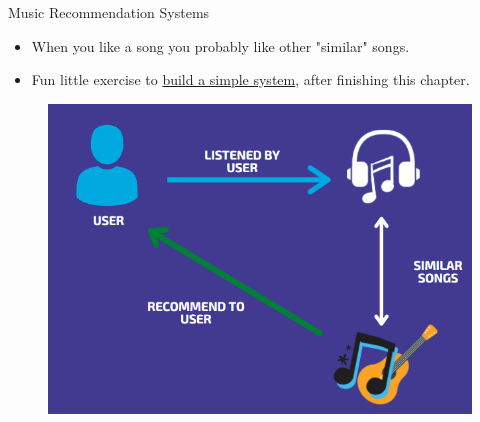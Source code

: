 \documentclass[serif, aspectratio=169]{beamer}
\begin{document}
\begin{frame}{Music Recommendation Systems }
\begin{itemize}
    \item When you like a song you probably like other "similar" songs.
    \item Fun little exercise to \href{https://machinelearninggeek.com/spotify-song-recommender-system-in-python/}{build a simple system}, after finishing this chapter.
\end{itemize}
  
    \begin{figure}
        \centering
        \includegraphics[scale=0.3]{pic/figs/image-4.png}
    \end{figure}
    

\end{frame}
\end{document}
